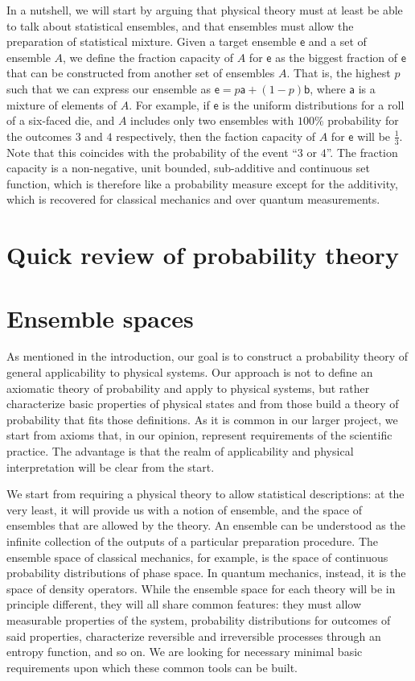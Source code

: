\documentclass[10pt,twocolumn, nofootinbib]{revtex4-2}
\newcommand{\ens}[1][e] {\mathsf{#1}} %
\begin{document}
In a nutshell, we will start by arguing that physical theory must at least be able to talk about statistical ensembles, and that ensembles must allow the preparation of statistical mixture. Given a target ensemble $\ens$ and a set of ensemble $A$, we define the fraction capacity of $A$ for $\ens$ as the biggest fraction of $\ens$ that can be constructed from another set of ensembles $A$. That is, the highest $p$ such that we can express our ensemble as $\ens = p \ens[a] + (1-p) \ens[b]$, where $\ens[a]$ is a mixture of elements of $A$. For example, if $\ens$ is the uniform distributions for a roll of a six-faced die, and $A$ includes only two ensembles with $100\%$ probability for the outcomes $3$ and $4$ respectively, then the faction capacity of $A$ for $\ens$ will be $\frac{1}{3}$. Note that this coincides with the probability of the event ``$3$ or $4$''. The fraction capacity is a non-negative, unit bounded, sub-additive and continuous set function, which is therefore like a probability measure except for the additivity, which is recovered for classical mechanics and over quantum measurements.

\section{Quick review of probability theory}


\section{Ensemble spaces}

As mentioned in the introduction, our goal is to construct a probability theory of general applicability to physical systems. Our approach is not to define an axiomatic theory of probability and apply to physical systems, but rather characterize basic properties of physical states and from those build a theory of probability that fits those definitions. As it is common in our larger project, we start from axioms that, in our opinion, represent requirements of the scientific practice. The advantage is that the realm of applicability and physical interpretation will be clear from the start. 

We start from requiring a physical theory to allow statistical descriptions: at the very least, it will provide us with a notion of ensemble, and the space of ensembles that are allowed by the theory. An ensemble can be understood as the infinite collection of the outputs of a particular preparation procedure. The ensemble space of classical mechanics, for example, is the space of continuous probability distributions of phase space. In quantum mechanics, instead, it is the space of density operators. While the ensemble space for each theory will be in principle different, they will all share common features: they must allow measurable properties of the system, probability distributions for outcomes of said properties, characterize reversible and irreversible processes through an entropy function, and so on. We are looking for necessary minimal basic requirements upon which these common tools can be built.
\end{document}
